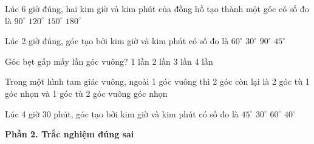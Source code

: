 \begin{ex} %
Lúc 6 giờ đúng, hai kim giờ và kim phút của đồng hồ tạo thành một góc có số đo là
\choice
{$90^\circ$}
{$120^\circ$}
{$150^\circ$}
{\True $180^\circ$}
\end{ex}

\begin{ex} %
Lúc 2 giờ đúng, góc tạo bởi kim giờ và kim phút có số đo là
\choice
{\True $60^\circ$}
{$30^\circ$}
{$90^\circ$}
{$45^\circ$}
\end{ex}

\begin{ex} %
Góc bẹt gấp mấy lần góc vuông?
\choice
{$1$ lần}
{\True $2$ lần}
{$3$ lần}
{$4$ lần}
\end{ex}

\begin{ex} %
Trong một hình tam giác vuông, ngoài 1 góc vuông thì 2 góc còn lại là
\choice
{2 góc tù}
{1 góc nhọn và 1 góc tù}
{2 góc vuông}
{ góc nhọn}
\end{ex}

\begin{ex} %
Lúc 4 giờ 30 phút, góc tạo bởi kim giờ và kim phút có số đo là
\choice
{\True $45^\circ$}
{$30^\circ$}
{$60^\circ$}
{$40^\circ$}
\end{ex}

\textbf{Phần 2. Trắc nghiệm đúng sai}

